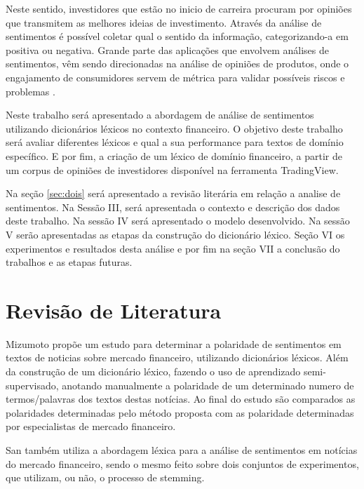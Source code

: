 \documentclass[conference]{IEEEtran}
\begin{document}
Neste sentido, investidores que estão no inicio de carreira procuram por opiniões que transmitem as melhores ideias de investimento. Através da análise de sentimentos é possível coletar qual o sentido da informação, categorizando-a em positiva ou negativa. Grande parte das aplicações que envolvem análises de sentimentos, vêm sendo direcionadas na análise de opiniões de produtos, onde o engajamento de consumidores servem de métrica para validar possíveis riscos e problemas \cite{Shahana:2015}. 

Neste trabalho será apresentado a abordagem de análise de sentimentos utilizando dicionários léxicos no contexto financeiro. O objetivo deste trabalho será avaliar diferentes léxicos e qual a sua performance para textos de domínio específico. E por fim, a criação de um léxico de domínio financeiro, a partir de um corpus de opiniões de investidores disponível na ferramenta TradingView. 

Na seção \ref{sec:dois} será apresentado a revisão literária em relação a analise de sentimentos. Na Sessão III, será apresentada o contexto e descrição dos dados deste trabalho. Na sessão IV será apresentado o modelo desenvolvido. Na sessão V serão apresentadas as etapas da construção do dicionário léxico. Seção VI os experimentos e resultados desta análise e por fim na seção VII a conclusão do trabalhos e as etapas futuras. 


\section{\label{sec:dois}Revisão de Literatura}

Mizumoto \cite{Mizumoto:2012} propõe um estudo para determinar a polaridade de sentimentos em textos de noticias sobre mercado financeiro, utilizando dicionários léxicos. Além da construção de um dicionário léxico, fazendo o uso de aprendizado semi-supervisado, anotando manualmente a polaridade de um determinado numero de termos/palavras dos textos destas notícias. Ao final do estudo são comparados as polaridades determinadas pelo método proposta com as polaridade determinadas por especialistas de mercado financeiro. 

San \cite{Li:2013} também utiliza a abordagem léxica para a análise de sentimentos em notícias do mercado financeiro, sendo o mesmo feito sobre dois conjuntos de experimentos, que utilizam, ou não, o processo de stemming. 
\end{document}
